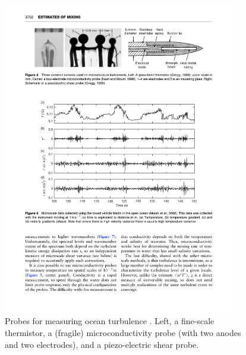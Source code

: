 \documentclass[11pt]{article}
\begin{document}
\begin{figure}[hbtp]
  \begin{center}
    \includegraphics[width=4in]{images/KlymakNash09Fig5}
    \caption{Probes for measuring ocean turbulence \citep{klymaknash09}.  Left, a fine-scale thermistor, a (fragile) microconductivity probe (with two anodes and two electrodes), and a piezo-electric shear probe.}   
    \label{fig:KlymakNash09Fig5}
  \end{center}
\end{figure}
\end{document}

